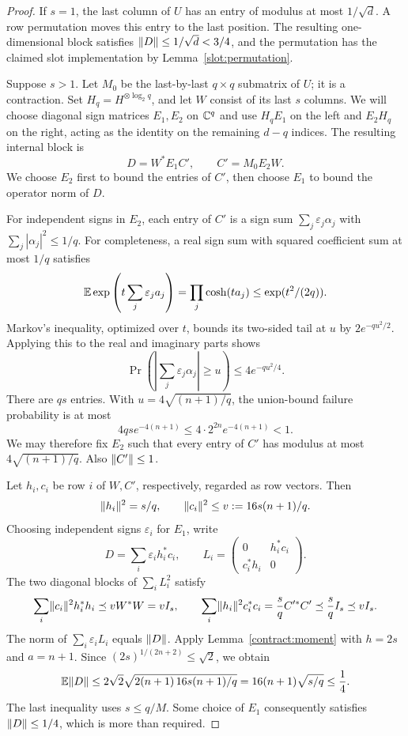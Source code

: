 \begin{proof}
If $s=1$, the last column of $U$ has an entry of modulus at most $1/\sqrt d$.
A row permutation moves this entry to the last position.  The resulting
one-dimensional block satisfies $\lVert D\rVert\leq1/\sqrt d<3/4$, and the permutation
has the claimed slot implementation by Lemma~\ref{slot:permutation}.

Suppose $s>1$.  Let $M_0$ be the last-by-last $q\times q$ submatrix of $U$;
it is a contraction.  Set
$H_q=H^{\otimes\log_2q}$, and let $W$ consist of its last $s$ columns.  We
will choose diagonal sign matrices $E_1,E_2$ on $\mathbb C^q$ and use
$H_qE_1$ on the left and $E_2H_q$ on the right, acting as the identity on the
remaining $d-q$ indices.  The resulting internal block is
\begin{equation}\label{contract:D-signs}
 D=W^*E_1C',\qquad C'=M_0E_2W.
\end{equation}
We choose $E_2$ first to bound the entries of $C'$, then choose $E_1$ to
bound the operator norm of $D$.

For independent signs in $E_2$, each entry of $C'$ is a sign sum
$\sum_j\varepsilon_j\alpha_j$ with $\sum_j|\alpha_j|^2\leq1/q$.
For completeness, a real sign sum with squared coefficient sum at most $1/q$
satisfies
\[
 \mathbb E\exp\left(t\sum_j\varepsilon_j a_j\right)
 =\prod_j\cosh(ta_j)\leq\exp(t^2/(2q)).
\]
Markov's inequality, optimized over $t$, bounds its two-sided tail at $u$ by
$2e^{-qu^2/2}$.  Applying this to the real and imaginary parts shows
\[
 \Pr\left(\left|\sum_j\varepsilon_j\alpha_j\right|\geq u\right)
 \leq4e^{-qu^2/4}.
\]
There are $qs$ entries.  With $u=4\sqrt{(n+1)/q}$, the union-bound failure
probability is at most
\[
 4qs e^{-4(n+1)}\leq4\cdot2^{2n}e^{-4(n+1)}<1.
\]
We may therefore fix $E_2$ such that every entry of $C'$ has modulus at most
$4\sqrt{(n+1)/q}$.  Also $\lVert C'\rVert\leq1$.

Let $h_i,c_i$ be row $i$ of $W,C'$, respectively, regarded as row vectors.
Then
\[
 \lVert h_i\rVert^2=s/q,\qquad
 \lVert c_i\rVert^2\leq v:=16s(n+1)/q.
\]
Choosing independent signs $\varepsilon_i$ for $E_1$, write
\[
 D=\sum_i\varepsilon_i h_i^*c_i,
 \qquad
 L_i=\begin{pmatrix}0&h_i^*c_i\\c_i^*h_i&0\end{pmatrix}.
\]
The two diagonal blocks of $\sum_iL_i^2$ satisfy
\[
 \sum_i\lVert c_i\rVert^2h_i^*h_i\preceq vW^*W=vI_s,
 \qquad
 \sum_i\lVert h_i\rVert^2c_i^*c_i
 =\frac sq C'^*C'\preceq\frac sq I_s\preceq vI_s.
\]
The norm of $\sum_i\varepsilon_iL_i$ equals $\lVert D\rVert$.  Apply
Lemma~\ref{contract:moment} with $h=2s$ and $a=n+1$.  Since
$(2s)^{1/(2n+2)}\leq\sqrt2$, we obtain
\[
 \mathbb E\lVert D\rVert
 \leq 2\sqrt2\sqrt{2(n+1)\,16s(n+1)/q}
 =16(n+1)\sqrt{s/q}
 \leq\frac14.
\]
The last inequality uses $s\leq q/M$.  Some choice of $E_1$ consequently
satisfies $\lVert D\rVert\leq1/4$, which is more than required.


\end{proof}
